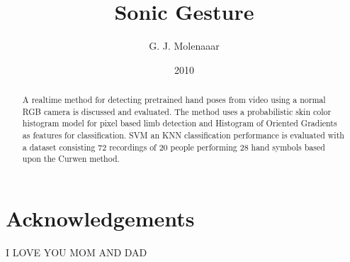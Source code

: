 \documentclass[a4paper]{report}
\begin{document}
\title{Sonic Gesture}
\author{G. J. Molenaaar}
\date{2010}

\maketitle{}

\newpage{}

\begin{abstract}
A real\-time method for detecting pre\-trained hand poses from
video using a normal RGB camera is discussed and evaluated. The method uses a probabilistic skin color histogram model for pixel based limb detection and Histogram of Oriented Gradients as features for classification. SVM an KNN classification performance is evaluated with a dataset consisting 72 recordings of 20 people performing 28 hand symbols based upon the Curwen method. 
\end{abstract}
\newpage{}

\tableofcontents{}
\listoffigures{}
\listoftables{}

\chapter*{Acknowledgements}
I LOVE YOU MOM AND DAD
















\end{document}
